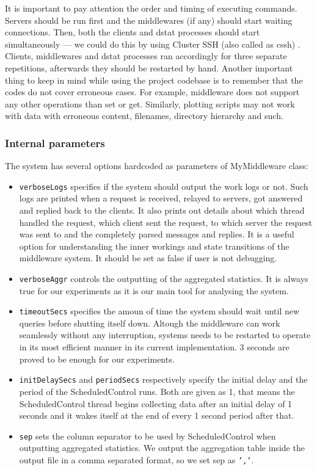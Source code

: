 \documentclass[11pt,a4paper]{article}
\begin{document}
\par It is important to pay attention the order and timing of executing commands. Servers should be run first and the middlewares (if any) should start waiting connections. Then, both the clients and dstat processes should start simultaneously — we could do this by using Cluster SSH (also called as cssh) \cite{cssh}. Clients, middlewares and dstat processes ran accordingly for three separate repetitions, afterwards they should be restarted by hand. Another important thing to keep in mind while using the project codebase is to remember that the codes do not cover erroneous cases. For example, middleware does not support any other operations than set or get. Similarly, plotting scripts may not work with data with erroneous content, filenames, directory hierarchy and such.

\subsubsection*{Internal parameters} \label{sec:app-internalparameters}
The system has several options hardcoded as parameters of MyMiddleware class:
\begin{itemize}
\item \texttt{verboseLogs} specifies if the system should output the work logs or not. Such logs are printed when a request is received, relayed to servers, got answered and replied back to the clients. It also prints out details about which thread handled the request, which client sent the request, to which server the request was sent to and the completely parsed messages and replies. It is a useful option for understanding the inner workings and state transitions of the middleware system. It should be set as false if user is not debugging.
\item \texttt{verboseAggr} controls the outputting of the aggregated statistics. It is always true for our experiments as it is our main tool for analysing the system.
\item \texttt{timeoutSecs} specifies the amoun of time the system should wait until new queries before shutting itself down. Altough the middleware can work seamlessly without any interruption, systems needs to be restarted to operate in its most efficient manner in its current implementation. 3 seconds are proved to be enough for our experiments.
\item \texttt{initDelaySecs} and \texttt{periodSecs} respectively specify the initial delay and the period of the ScheduledControl runs. Both are given as 1, that means the ScheduledControl thread begins collecting data after an initial delay of 1 seconds and it wakes itself at the end of every 1 second period after that.
\item \texttt{sep} sets the column separator to be used by ScheduledControl when outputting aggregated statistics. We output the aggregation table inside the output file in a comma separated format, so we set sep as \texttt{','}.
\end{itemize}
\end{document}
